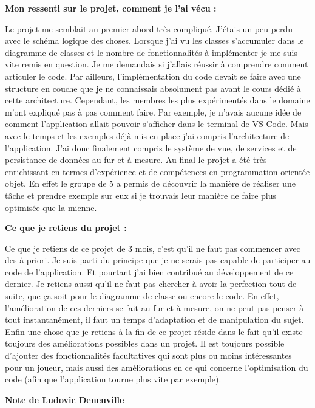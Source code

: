 \documentclass[11pt]{article}
\begin{document}
\bigbreak
\textbf{ Mon ressenti sur le projet, comment je l’ai vécu :  }

Le projet me semblait au premier abord très compliqué. J’étais un peu perdu avec le schéma logique des choses. Lorsque j’ai vu les classes s’accumuler dans le diagramme de classes et le nombre de fonctionnalités à implémenter je me suis vite remis en question. Je me demandais si j’allais réussir à comprendre comment articuler le code. Par ailleurs, l’implémentation du code devait se faire avec une structure en couche que je ne connaissais absolument pas avant le cours dédié à cette architecture. Cependant, les membres les plus expérimentés dans le domaine m’ont expliqué pas à pas comment faire. Par exemple, je n'avais aucune idée de comment l’application allait pouvoir s’afficher dans le terminal de VS Code. Mais avec le temps et les exemples déjà mis en place j’ai compris l’architecture de l’application. J’ai donc finalement compris le système de vue, de services et de persistance de données au fur et à mesure. Au final le projet a été très enrichissant en termes d’expérience et de compétences en programmation orientée objet. En effet le groupe de 5 a permis de découvrir la manière de réaliser une tâche et prendre exemple sur eux si je trouvais leur manière de faire plus optimisée que la mienne. 

\bigbreak
\textbf{ Ce que je retiens du projet :   }

Ce que je retiens de ce projet de 3 mois, c’est qu’il ne faut pas commencer avec des à priori. Je suis parti du principe que je ne serais pas capable de participer au code de l’application. Et pourtant j’ai bien contribué au développement de ce dernier. Je retiens aussi qu’il ne faut pas chercher à avoir la perfection tout de suite, que ça soit pour le diagramme de classe ou encore le code. En effet, l'amélioration de ces derniers se fait au fur et à mesure, on ne peut pas penser à tout instantanément, il faut un temps d'adaptation et de manipulation du sujet. Enfin une chose que je retiens à la fin de ce projet réside dans le fait qu’il existe toujours des améliorations possibles dans un projet. Il est toujours possible d’ajouter des fonctionnalités facultatives qui sont plus ou moins intéressantes pour un joueur, mais aussi des améliorations en ce qui concerne l’optimisation du code (afin que l’application tourne plus vite par exemple).

\newpage



\textbf{\Large Note de Ludovic Deneuville}
\end{document}
